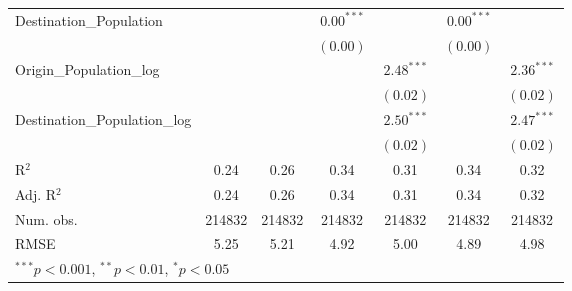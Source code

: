 \begin{table}
\begin{center}
\begin{tabular}{l c c c c c c }
			Destination\_Population      &               &               & $0.00^{***}$  &                & $0.00^{***}$  &                \\
			&               &               & $(0.00)$      &                & $(0.00)$      &                \\
			Origin\_Population\_log      &               &               &               & $2.48^{***}$   &               & $2.36^{***}$   \\
			&               &               &               & $(0.02)$       &               & $(0.02)$       \\
			Destination\_Population\_log &               &               &               & $2.50^{***}$   &               & $2.47^{***}$   \\
			&               &               &               & $(0.02)$       &               & $(0.02)$       \\
			\hline
			R$^2$                        & 0.24          & 0.26          & 0.34          & 0.31           & 0.34          & 0.32           \\
			Adj. R$^2$                   & 0.24          & 0.26          & 0.34          & 0.31           & 0.34          & 0.32           \\
			Num. obs.                    & 214832        & 214832        & 214832        & 214832         & 214832        & 214832         \\
			RMSE                         & 5.25          & 5.21          & 4.92          & 5.00           & 4.89          & 4.98           \\
			\hline
			\multicolumn{7}{l}{\scriptsize{$^{***}p<0.001$, $^{**}p<0.01$, $^*p<0.05$}}
		\end{tabular}

		\label{table:Gravity2014Q1}
	\end{center}
\end{table}

